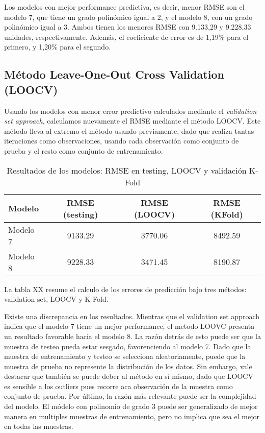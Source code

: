 \documentclass[11pt,oneside]{article}
\begin{document}
	
	Los modelos con mejor performance predictiva, es decir, menor RMSE son el modelo 7, que tiene un grado polinómico igual a 2, y el modelo 8, con un grado polinómico igual a 3. Ambos tienen los menores RMSE con 9.133,29 y 9.228,33 unidades, respectivamente. Además, el coeficiente de error es de 1,19\% para el primero, y 1,20\% para el segundo. 
	
	\subsection{Método Leave-One-Out Cross Validation (LOOCV)}
	
	Usando los modelos con menor error predictivo calculados mediante el \textit{validation set approach}, calculamos nuevamente el RMSE mediante el método LOOCV. Este método lleva al extremo el método usando previamente, dado que realiza tantas iteraciones como observaciones, usando cada observación como conjunto de prueba y el resto como conjunto de entrenamiento.

\begin{table}[H]
\centering
\begin{tabular}{lccc}
\hline
\textbf{Modelo} & \textbf{RMSE (testing)} & \textbf{RMSE (LOOCV)} & \textbf{RMSE (KFold)} \\ \hline
Modelo 7        & 9133.29                & 3770.06               & 8492.59               \\
Modelo 8        & 9228.33                & 3471.45               & 8190.87               \\ \hline
\end{tabular}
\caption{Resultados de los modelos: RMSE en testing, LOOCV y validación K-Fold}
\label{tab:resultados_combinados}
\end{table}


La tabla XX resume el calculo de los errores de predicción bajo tres métodos: validation set, LOOCV y K-Fold. 

Existe una discrepancia en los resultados. Mientras que el validation set approach indica que el modelo 7 tiene un mejor performance, el metodo LOOVC presenta un resultado favorable hacia el modelo 8. La razón detrás de esto puede ser que la muestra de testeo pueda estar sesgado, favorenciendo al modelo 7. Dado que la muestra de entrenamiento y testeo se selecciona aleatoriamente, puede que la muestra de prueba no represente la distribución de los datos. Sin embargo, vale destacar que también se puede deber al método en sí mismo, dado que LOOCV es sensible a los outliers pues recorre aca observación de la muestra como conjunto de prueba. Por último, la razón más relevante puede ser la complejidad del modelo. El módelo con polinomio de grado 3 puede ser generalizado de mejor manera en multiples muestras de entrenamiento, pero no implica que sea el mejor en todas las muestras.
\end{document}
